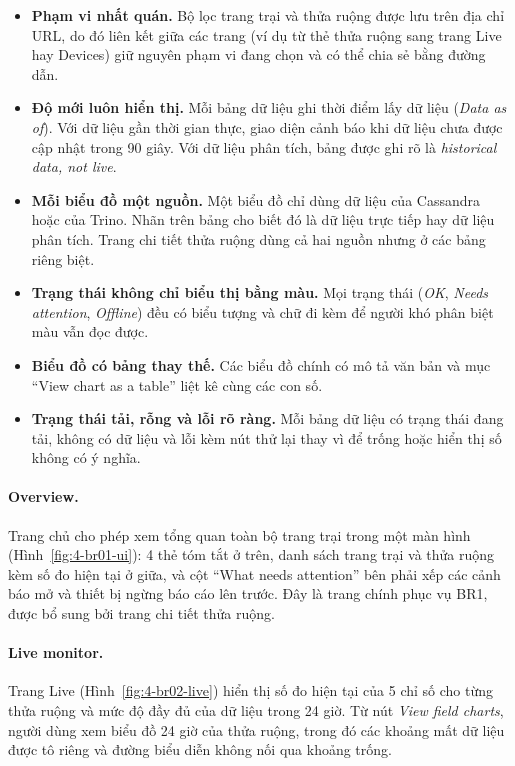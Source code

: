 \begin{itemize}
  \item \textbf{Phạm vi nhất quán.} Bộ lọc trang trại và thửa ruộng được lưu trên địa chỉ URL, do đó liên kết giữa các trang (ví dụ từ thẻ thửa ruộng sang trang Live hay Devices) giữ nguyên phạm vi đang chọn và có thể chia sẻ bằng đường dẫn.
  \item \textbf{Độ mới luôn hiển thị.} Mỗi bảng dữ liệu ghi thời điểm lấy dữ liệu (\emph{Data as of}). Với dữ liệu gần thời gian thực, giao diện cảnh báo khi dữ liệu chưa được cập nhật trong 90 giây. Với dữ liệu phân tích, bảng được ghi rõ là \emph{historical data, not live}.
  \item \textbf{Mỗi biểu đồ một nguồn.} Một biểu đồ chỉ dùng dữ liệu của Cassandra hoặc của Trino. Nhãn trên bảng cho biết đó là dữ liệu trực tiếp hay dữ liệu phân tích. Trang chi tiết thửa ruộng dùng cả hai nguồn nhưng ở các bảng riêng biệt.
  \item \textbf{Trạng thái không chỉ biểu thị bằng màu.} Mọi trạng thái (\emph{OK}, \emph{Needs attention}, \emph{Offline}) đều có biểu tượng và chữ đi kèm để người khó phân biệt màu vẫn đọc được.
  \item \textbf{Biểu đồ có bảng thay thế.} Các biểu đồ chính có mô tả văn bản và mục ``View chart as a table'' liệt kê cùng các con số.
  \item \textbf{Trạng thái tải, rỗng và lỗi rõ ràng.} Mỗi bảng dữ liệu có trạng thái đang tải, không có dữ liệu và lỗi kèm nút thử lại thay vì để trống hoặc hiển thị số không có ý nghĩa.
\end{itemize}

\paragraph{Overview.} Trang chủ cho phép xem tổng quan toàn bộ trang trại trong một màn hình (Hình~\ref{fig:4-br01-ui}): 4 thẻ tóm tắt ở trên, danh sách trang trại và thửa ruộng kèm số đo hiện tại ở giữa, và cột ``What needs attention'' bên phải xếp các cảnh báo mở và thiết bị ngừng báo cáo lên trước. Đây là trang chính phục vụ BR1, được bổ sung bởi trang chi tiết thửa ruộng.

\paragraph{Live monitor.} Trang Live (Hình~\ref{fig:4-br02-live}) hiển thị số đo hiện tại của 5 chỉ số cho từng thửa ruộng và mức độ đầy đủ của dữ liệu trong 24 giờ. Từ nút \emph{View field charts}, người dùng xem biểu đồ 24 giờ của thửa ruộng, trong đó các khoảng mất dữ liệu được tô riêng và đường biểu diễn không nối qua khoảng trống.


